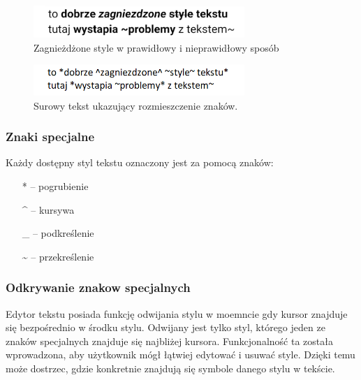 \documentclass[shortabstract]{iithesis}
\begin{document}
\begin{figure}[h]
    \centering
    \includegraphics[width=8cm]{images/style.png}
    \caption{Zagnieżdżone style w prawidłowy i nieprawidłowy sposób}
    \vspace{3mm}
\end{figure}

\begin{figure}[h]
    \centering
    \includegraphics[width=8cm]{images/style_surowy_tekst.png}
    \caption{Surowy tekst ukazujący rozmieszczenie znaków.}
    \vspace{3mm}
\end{figure}

\subsubsection{Znaki specjalne}

Każdy dostępny styl tekstu oznaczony jest za pomocą znaków:

\begin{itemize}
    \item [*] \hspace{1mm} -- pogrubienie
    \item [\^{}] \hspace{1mm} -- kursywa
    \item [\_{}] \hspace{1mm} -- podkreślenie
    \item [\~{}] \hspace{1mm} -- przekreślenie
\end{itemize}

\pagebreak

\subsubsection{Odkrywanie znakow specjalnych}

Edytor tekstu posiada funkcję odwijania stylu w moemncie gdy kursor znajduje się bezpośrednio w środku stylu. Odwijany jest tylko styl, którego jeden ze znaków specjalnych znajduje się najbliżej kursora. Funkcjonalność ta została wprowadzona, aby użytkownik mógł łątwiej edytować i usuwać style.
Dzięki temu może dostrzec, gdzie konkretnie znajdują się symbole danego stylu w tekście.
\end{document}
